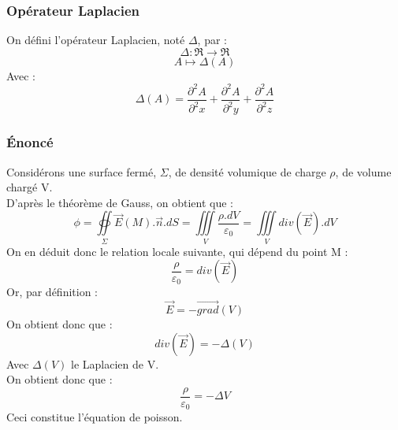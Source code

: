 \subsubsection{Opérateur Laplacien}
\begin{de}
On défini l'opérateur Laplacien, noté $\Delta$, par : 
$$\Delta : \Re \rightarrow \Re$$
$$A \mapsto \Delta(A)$$
Avec : 
$$\Delta(A) = \dfrac{\partial^2 A}{\partial^2 x} + \dfrac{\partial^2 A}{\partial^2 y} + \dfrac{\partial^2 A}{\partial^2 z}$$ 
\end{de}
\subsubsection{Énoncé}
Considérons une surface fermé, $\Sigma$, de densité volumique de charge $\rho$, de volume chargé V.\\
D'après le théorème de Gauss, on obtient que : 
$$\phi = \underset{\Sigma}\oiint\overrightarrow{E}(M).\overrightarrow{n}.dS = \underset{V}\iiint \dfrac{\rho.dV}{\varepsilon_0} = \underset{V}\iiint div(\overrightarrow{E}).dV$$
On en déduit donc le relation locale suivante, qui dépend du point M :
$$\dfrac{\rho}{\varepsilon_0} = div(\overrightarrow{E})$$
Or, par définition : 
$$\overrightarrow{E} = -\overrightarrow{grad}(V)$$
On obtient donc que : 
$$div(\overrightarrow{E}) = -\Delta(V)$$
Avec $\Delta(V)$ le Laplacien de V.\\
On obtient donc que : 
$$\dfrac{\rho}{\varepsilon_0} = -\Delta V$$
Ceci constitue l'équation de poisson.
